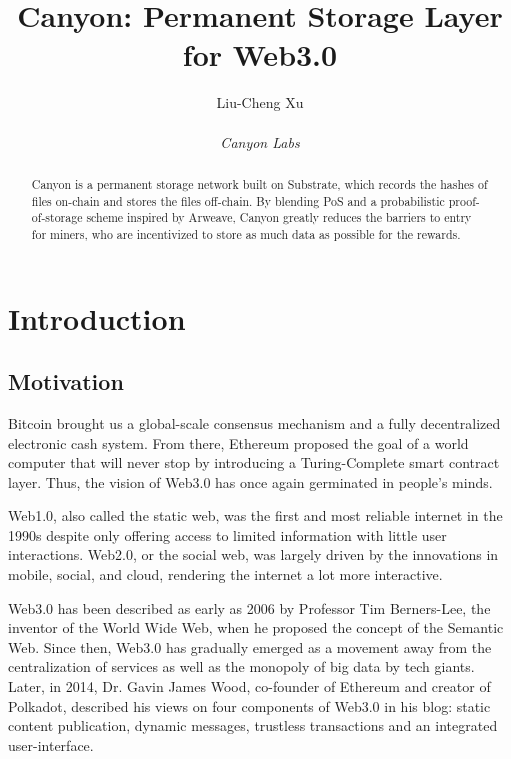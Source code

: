 \documentclass[]{article}
\title{Canyon: Permanent Storage Layer for Web3.0}
\author{
    Liu-Cheng Xu\\
    \\
    \textit{Canyon Labs}
}
\date{}
\begin{document}
\maketitle

\begin{abstract}

Canyon is a permanent storage network built on Substrate, which records the hashes of files on-chain and stores the files off-chain. By blending PoS and a probabilistic proof-of-storage scheme inspired by Arweave, Canyon greatly reduces the barriers to entry for miners, who are incentivized to store as much data as possible for the rewards.

\end{abstract}

\tableofcontents

\newpage

\section{Introduction}

\subsection{Motivation}

Bitcoin\cite{ref6} brought us a global-scale consensus mechanism and a fully decentralized electronic cash system. From there, Ethereum\cite{ref8} proposed the goal of a world computer that will never stop by introducing a Turing-Complete smart contract layer. Thus, the vision of Web3.0 has once again germinated in people's minds.

Web1.0, also called the static web, was the first and most reliable internet in the 1990s despite only offering access to limited information with little user interactions. Web2.0, or the social web, was largely driven by the innovations in mobile, social, and cloud, rendering the internet a lot more interactive.

Web3.0 has been described as early as 2006 by Professor Tim Berners-Lee, the inventor of the World Wide Web, when he proposed the concept of the Semantic Web. Since then, Web3.0 has gradually emerged as a movement away from the centralization of services as well as the monopoly of big data by tech giants. Later, in 2014, Dr. Gavin James Wood, co-founder of Ethereum and creator of Polkadot, described his views on four components of Web3.0\cite{ref7} in his blog: static content publication, dynamic messages, trustless transactions and an integrated user-interface.
\end{document}
